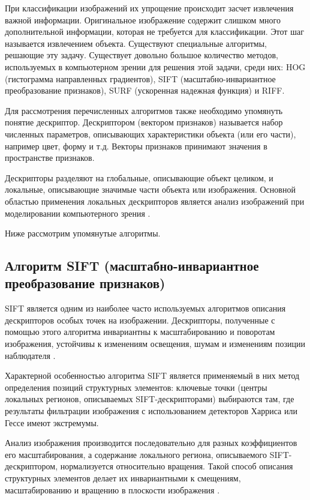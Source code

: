 При классификации изображений их упрощение происходит засчет извлечения важной информации. Оригинальное изображение содержит слишком много дополнительной информации, которая не требуется для классификации. Этот шаг
называется извлечением объекта. Существуют специальные алгоритмы, решающие эту задачу. Существует довольно большое количество методов, используемых в компьютерном зрении для решения этой задачи, среди них: HOG (гистограмма направленных градиентов), SIFT (масштабно-инвариантное преобразование признаков), SURF (ускоренная надежная функция) и RIFF.

Для рассмотрения перечисленных алгоритмов также необходимо упомянуть понятие дескриптор. Дескриптором (вектором признаков) называется набор численных параметров, описывающих
характеристики объекта (или его части), например цвет, форму и т.д. Векторы признаков принимают значения в пространстве признаков. 

Дескрипторы разделяют на глобальные, описывающие объект целиком, и локальные, описывающие значимые части объекта или изображения. Основной областью применения локальных дескрипторов является анализ изображений при моделировании компьютерного зрения \cite{deck}.  

Ниже рассмотрим упомянутые алгоритмы.

\subsection{Алгоритм SIFT (масштабно-инвариантное преобразование признаков)}

SIFT является одним из наиболее часто используемых алгоритмов описания дескрипторов
особых точек на изображении. Дескрипторы, полученные с помощью этого алгоритма инвариантны к масштабированию и поворотам изображения, устойчивы
к изменениям освещения, шумам и изменениям
позиции наблюдателя \cite{sift1}. 

Характерной особенностью алгоритма SIFT является применяемый в них метод
определения позиций структурных элементов:
ключевые точки (центры локальных регионов,
описываемых SIFT-дескрипторами) выбираются там, где результаты фильтрации изображения с использованием детекторов Харриса
или Гессе имеют экстремумы. 

Анализ
изображения производится последовательно для разных коэффициентов его масштабирования, а содержание локального региона,
описываемого SIFT-дескриптором, нормализуется относительно вращения. Такой способ
описания структурных элементов делает их
инвариантными к смещениям, масштабированию и вращению в плоскости изображения \cite{sift2}.



